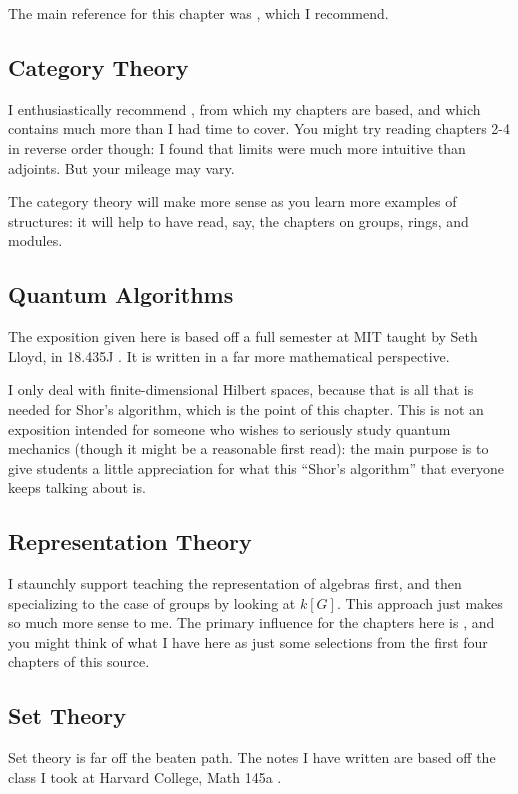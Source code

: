 The main reference for this chapter was \cite{ref:dartmouth}, which I recommend.

\subsection{Category Theory}
I enthusiastically recommend \cite{ref:msci},
from which my chapters are based,
and which contains much more than I had time to cover.
You might try reading chapters {2-4} in reverse order though:
I found that limits were much more intuitive than adjoints.
But your mileage may vary.

The category theory will make more sense as you learn
more examples of structures: it will help to have read,
say, the chapters on groups, rings, and modules.

\subsection{Quantum Algorithms}
The exposition given here is based off a full semester
at MIT taught by Seth Lloyd, in 18.435J \cite{ref:18-435}.
It is written in a far more mathematical perspective.

I only deal with finite-dimensional Hilbert spaces,
because that is all that is needed for Shor's algorithm,
which is the point of this chapter.
This is not an exposition intended for someone who wishes to seriously
study quantum mechanics (though it might be a reasonable first read):
the main purpose is to give students a little appreciation for
what this ``Shor's algorithm'' that everyone keeps talking about is.

\subsection{Representation Theory}
I staunchly support teaching the representation of algebras first,
and then specializing to the case of groups by looking at $k[G]$.
This approach just makes so much more sense to me.
The primary influence for the chapters here is \cite{ref:etingof},
and you might think of what I have here as just some selections
from the first four chapters of this source.

\subsection{Set Theory}
Set theory is far off the beaten path.
The notes I have written are based off the class I took at Harvard College,
Math 145a \cite{ref:145a}.

